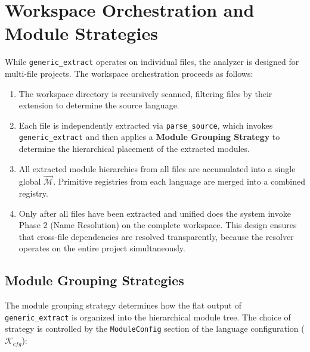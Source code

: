 \section{Workspace Orchestration and Module Strategies}
\label{sec:workspace_orchestration}

While \texttt{generic\_extract} operates on individual files, the analyzer is designed for multi-file projects. The workspace orchestration proceeds as follows:

\begin{enumerate}
  \item The workspace directory is recursively scanned, filtering files by their extension to determine the source language.
  \item Each file is independently extracted via \texttt{parse\_source}, which invokes \texttt{generic\_extract} and then applies a \textbf{Module Grouping Strategy} to determine the hierarchical placement of the extracted modules.
  \item All extracted module hierarchies from all files are accumulated into a single global \texttt{$\vec{\mathcal{M}}$}. Primitive registries from each language are merged into a combined registry.
  \item Only after all files have been extracted and unified does the system invoke Phase 2 (Name Resolution) on the complete workspace. This design ensures that cross-file dependencies are resolved transparently, because the resolver operates on the entire project simultaneously.
\end{enumerate}

\subsection{Module Grouping Strategies}

The module grouping strategy determines how the flat output of \texttt{generic\_extract} is organized into the hierarchical module tree. The choice of strategy is controlled by the \texttt{ModuleConfig} section of the language configuration ($\mathcal{K}_{cfg}$):

